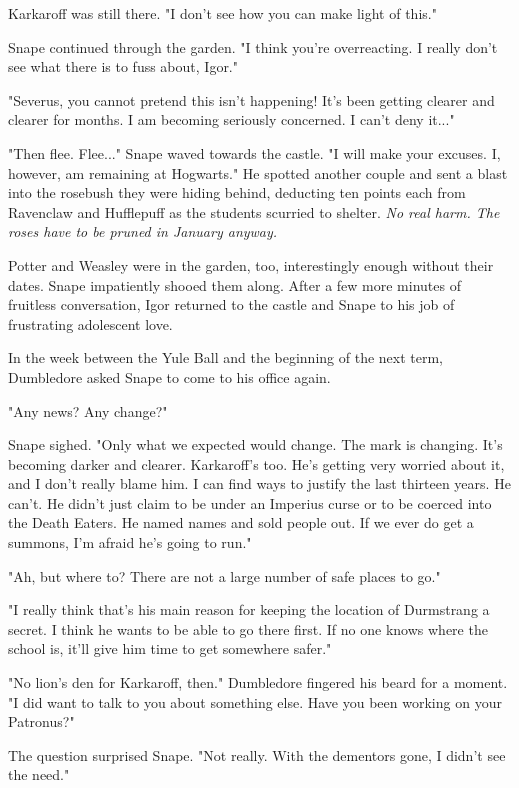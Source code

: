\documentclass[a4paper,11pt]{article}
\begin{document}
Karkaroff was still there. "I don't see how you can make light of this."

Snape continued through the garden. "I think you're overreacting. I really don't see what there is to fuss about, Igor."

"Severus, you cannot pretend this isn't happening! It's been getting clearer and clearer for months. I am becoming seriously concerned. I can't deny it..."

"Then flee. Flee..." Snape waved towards the castle. "I will make your excuses. I, however, am remaining at Hogwarts." He spotted another couple and sent a blast into the rosebush they were hiding behind, deducting ten points each from Ravenclaw and Hufflepuff as the students scurried to shelter. \emph{No real harm. The roses have to be pruned in January anyway.}

Potter and Weasley were in the garden, too, interestingly enough without their dates. Snape impatiently shooed them along. After a few more minutes of fruitless conversation, Igor returned to the castle and Snape to his job of frustrating adolescent love.

In the week between the Yule Ball and the beginning of the next term, Dumbledore asked Snape to come to his office again.

"Any news? Any change?"

Snape sighed. "Only what we expected would change. The mark is changing. It's becoming darker and clearer. Karkaroff's too. He's getting very worried about it, and I don't really blame him. I can find ways to justify the last thirteen years. He can't. He didn't just claim to be under an Imperius curse or to be coerced into the Death Eaters. He named names and sold people out. If we ever do get a summons, I'm afraid he's going to run."

"Ah, but where to? There are not a large number of safe places to go."

"I really think that's his main reason for keeping the location of Durmstrang a secret. I think he wants to be able to go there first. If no one knows where the school is, it'll give him time to get somewhere safer."

"No lion's den for Karkaroff, then." Dumbledore fingered his beard for a moment. "I did want to talk to you about something else. Have you been working on your Patronus?"

The question surprised Snape. "Not really. With the dementors gone, I didn't see the need."
\end{document}
